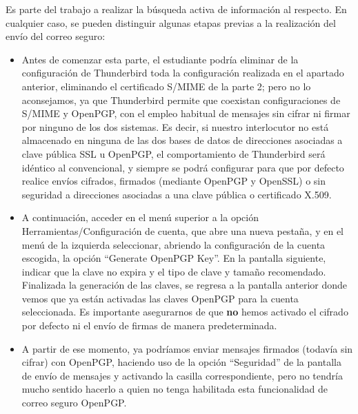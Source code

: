 Es parte del trabajo a realizar la búsqueda activa de información al respecto. En cualquier caso, se
pueden distinguir algunas etapas previas a la realización del envío del correo seguro:

\begin{itemize}[label=\textbullet]
    \item Antes de comenzar esta parte, el estudiante podría eliminar de la configuración de Thunderbird
    toda la configuración realizada en el apartado anterior, eliminando el certificado S/MIME de la parte 2;
    pero no lo aconsejamos, ya que Thunderbird permite que coexistan configuraciones de S/MIME y
    OpenPGP, con el empleo habitual de mensajes sin cifrar ni firmar por ninguno de los dos sistemas.
    Es decir, si nuestro interlocutor no está almacenado en ninguna de las dos bases de datos de direcciones
    asociadas a clave pública SSL u OpenPGP, el comportamiento de Thunderbird será idéntico al
    convencional, y siempre se podrá configurar para que por defecto realice envíos cifrados, firmados
    (mediante OpenPGP y OpenSSL) o sin seguridad a direcciones asociadas a una clave pública o
    certificado X.509.

    \item A continuación, acceder en el menú superior a la opción Herramientas/Configuración de cuenta,
    que abre una nueva pestaña, y en el menú de la izquierda seleccionar, abriendo la configuración de la
    cuenta escogida, la opción ``Generate OpenPGP Key''. En la pantalla siguiente, indicar que la clave no
    expira y el tipo de clave y tamaño recomendado. Finalizada la generación de las claves, se regresa a la
    pantalla anterior donde vemos que ya están activadas las claves OpenPGP para la cuenta seleccionada.
    Es importante asegurarnos de que \textbf{no} hemos activado el cifrado por defecto ni el envío de firmas
    de manera predeterminada.

    \item A partir de ese momento, ya podríamos enviar mensajes firmados (todavía sin cifrar) con OpenPGP,
    haciendo uso de la opción ``Seguridad'' de la pantalla de envío de mensajes y activando la casilla
    correspondiente, pero no tendría mucho sentido hacerlo a quien no tenga habilitada esta funcionalidad
    de correo seguro OpenPGP.


\end{itemize}
